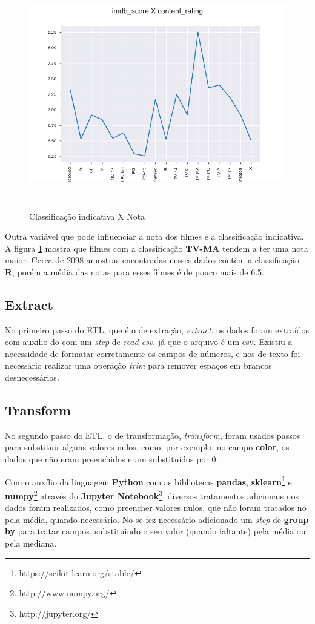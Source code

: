 \begin{figure}[H]
\centering
\includegraphics[height=10cm]{imagens/scoreXcontent.png}
\caption{Classificação indicativa X Nota}
\label{ratingXscore}
\end{figure}
Outra variável que pode influenciar a nota dos filmes é a classificação indicativa. A figura \ref{ratingXscore} mostra que filmes com a classificação \textbf{TV-MA} tendem a ter uma nota maior. Cerca de 2098 amostras encontradas nesses dados contêm a classificação \textbf{R}, porém a média das notas para esses filmes é de pouco mais de 6.5.

\subsection{Extract}
No primeiro passo do ETL, que é o de extração, \textit{extract}, os dados foram extraídos com auxilio do \pdi com um \textit{step} de \textit{read csv}, já que o arquivo é um csv. Existiu a necessidade de formatar corretamente os campos de números, e nos de texto foi necessário realizar uma operação \textit{trim} para remover espaços em brancos desnecessários. 

\subsection{Transform}
No segundo passo do ETL, o de transformação, \textit{transform}, foram usados passos para substituir alguns valores nulos, como, por exemplo, no campo \textbf{color}, os dados que não eram preenchidos eram substituídos por 0. 

Com o auxílio da linguagem \textbf{Python} com as bibliotecas \textbf{pandas}, \textbf{sklearn}\footnote{https://scikit-learn.org/stable/} e \textbf{numpy}\footnote{http://www.numpy.org/} através do \textbf{Jupyter Notebook}\footnote{http://jupyter.org/}, diversos tratamentos adicionais nos dados foram realizados, como preencher valores nulos, que não foram tratados no \pdi pela média, quando necessário. No \pdi se fez necessário adicionado um \textit{step} de \textbf{group by} para tratar campos, substituindo o seu valor (quando faltante) pela média ou pela mediana. 

